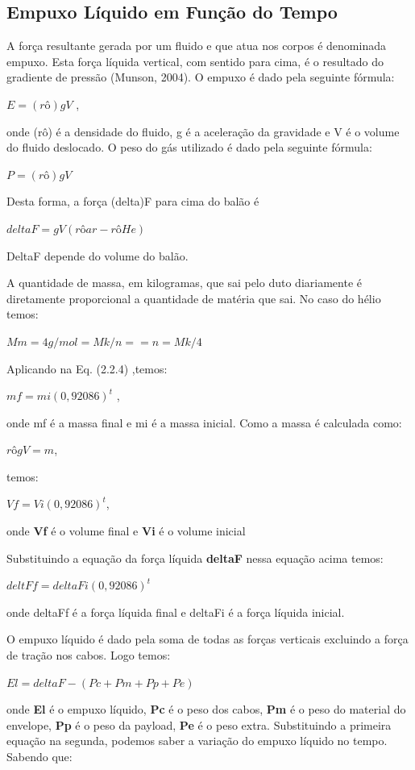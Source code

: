 \subsection{Empuxo Líquido em Função do Tempo} %
\label{sub:empuxo_l_quido_em_fun_o_do_tempo}

	A força resultante gerada por um  fluido e que atua nos corpos é denominada empuxo. Esta força líquida vertical, com sentido para cima, é o resultado do gradiente de pressão (Munson, 2004). O empuxo é dado pela seguinte fórmula:

	$E = (rô)gV$ ,

	onde (rô) é a densidade do fluido, g é a aceleração da gravidade e V é o volume do fluido deslocado.
	O peso do gás utilizado é dado pela seguinte fórmula:

	$P = (rô)g V$

	Desta forma, a força (delta)F para cima do balão é

	$deltaF =  g V (rôar - rôHe)$

	DeltaF depende do volume do balão.

	 A quantidade de massa, em kilogramas, que sai pelo duto diariamente é diretamente proporcional a quantidade de matéria que sai. No caso do hélio temos:

		 $Mm = 4g/mol = Mk/n   == n = Mk/4$

	Aplicando na Eq. (2.2.4) ,temos:

	$mf = mi (0,92086)^t$ ,

	 onde mf é a massa final e mi é a massa inicial.
	Como a massa é calculada como:

	$rô g V = m$,

	temos:

	$Vf = Vi (0,92086)^t$,

	 onde \textbf{Vf} é o volume final e \textbf{Vi} é o volume inicial

	Substituindo a equação da força líquida \textbf{deltaF} nessa equação acima temos:


	$deltFf = deltaFi(0,92086)^t$

	onde deltaFf é a força líquida final e deltaFi é a força líquida inicial.

	 O empuxo líquido é dado pela soma de todas as forças verticais excluindo a força de tração nos cabos. Logo temos:

	$El = deltaF - ( Pc + Pm + Pp+Pe)$

	onde \textbf{El} é o empuxo líquido, \textbf{Pc} é o peso dos cabos, \textbf{Pm} é o peso do material do envelope, \textbf{Pp} é o peso da payload, \textbf{Pe} é o peso extra.
	Substituindo a primeira equação na segunda, podemos saber a variação do empuxo líquido no tempo. Sabendo que:

